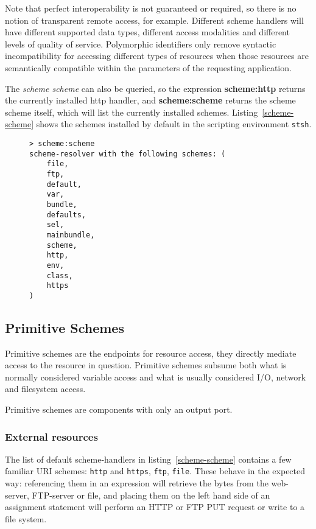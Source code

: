 \documentclass[preprint,authoryear]{acm_proc_article-sp}
\begin{document}
Note that perfect interoperability is not guaranteed or required, so there is no notion
of transparent remote access, for example.  Different scheme handlers will have different supported
data types, different access modalities and different levels of quality of service.
Polymorphic identifiers only remove syntactic incompatibility for accessing different types
of resources when those resources are semantically compatible within the parameters
of the requesting application.


The {\em scheme scheme} can also be queried,
so the expression {\bf scheme:http} returns the currently installed http handler, and 
{\bf scheme:scheme} returns the scheme scheme itself, which will list the currently
installed schemes.  Listing~\ref{scheme-scheme} shows the schemes installed by
default in the scripting environment {\tt stsh}.

\begin{figure}[htbp]
\begin{lstlisting}[style=L,label=scheme-scheme,caption=List of schemes via scheme:scheme.]
> scheme:scheme 
scheme-resolver with the following schemes: (
    file,
    ftp,
    default,
    var,
    bundle,
    defaults,
    sel,
    mainbundle,
    scheme,
    http,
    env,
    class,
    https
)
\end{lstlisting}
\end{figure}

\subsection{Primitive Schemes}
\label{primitiveSchemes}

Primitive schemes are the endpoints for resource access, they directly
mediate access to the resource in question.  Primitive schemes
subsume both what is normally considered variable access and 
what is usually considered I/O, network and filesystem access.

Primitive schemes are components with only an output port.

\subsubsection{External resources}
\label{externalResources}

The list of default scheme-handlers in listing~\ref{scheme-scheme} contains a few familiar URI schemes:
{\tt http} and {\tt https}, {\tt ftp}, {\tt file}.   These behave in the expected way:   referencing them in an expression will
retrieve the bytes from the web-server, FTP-server or file, and placing them on the left hand side of
an assignment statement will perform an HTTP or FTP PUT request or write to a file system.
\end{document}
